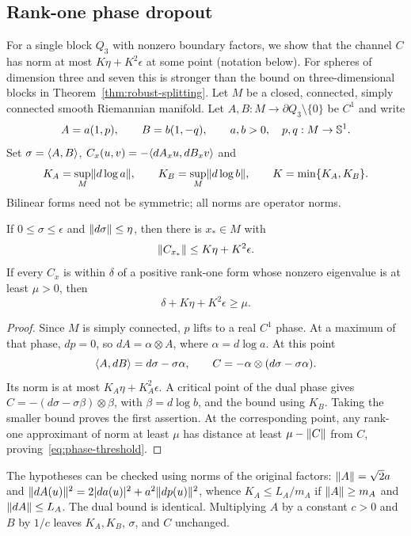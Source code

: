 \subsection{Rank-one phase dropout}
For a single block $Q_3$ with nonzero boundary factors, we show that
the channel $C$ has norm at most $K\eta+K^2\epsilon$ at some point
(notation below). For spheres of dimension
three and seven this is stronger than the bound on three-dimensional
blocks in Theorem~\ref{thm:robust-splitting}. Let $M$ be a closed, connected, simply connected smooth Riemannian manifold.
Let $A,B:M\to\partial Q_3\setminus\{0\}$ be $C^1$ and write
\[
 A=a(1,p),\qquad B=b(1,-q),\qquad a,b>0,\quad p,q:M\to\mathbb S^1.
\]
Set $\sigma=\langle A,B\rangle$, $C_x(u,v)=-\langle dA_xu,dB_xv\rangle$ and
\[
 K_A=\sup_M\lVert d\log a\rVert,\qquad K_B=\sup_M\lVert d\log b\rVert,
 \qquad K=\min\{K_A,K_B\}.
\]
Bilinear forms need not be symmetric; all norms are operator norms.

\begin{theorem}\label{thm:robust-phase}
If $0\leq\sigma\leq\epsilon$ and $\lVert d\sigma\rVert\leq\eta$, then
there is $x_*\in M$ with
\[
 \lVert C_{x_*}\rVert\leq K\eta+K^2\epsilon.
\]
If every $C_x$ is within $\delta$ of a positive rank-one form whose
nonzero eigenvalue is at least $\mu>0$, then
\begin{equation}\label{eq:phase-threshold}
 \delta+K\eta+K^2\epsilon\geq\mu.
\end{equation}
\end{theorem}
\begin{proof}
Since $M$ is simply connected, $p$ lifts to a real $C^1$ phase. At a maximum of
that phase, $dp=0$, so $dA=\alpha\otimes A$, where
$\alpha=d\log a$. At this point
\[
 \langle A,dB\rangle=d\sigma-\sigma\alpha,
 \qquad C=-\alpha\otimes(d\sigma-\sigma\alpha).
\]
Its norm is at most $K_A\eta+K_A^2\epsilon$. A critical point of the
dual phase gives $C=-(d\sigma-\sigma\beta)\otimes\beta$, with
$\beta=d\log b$, and the bound using $K_B$. Taking the smaller bound
proves the first assertion. At the corresponding point, any rank-one
approximant of norm at least $\mu$ has distance at least
$\mu-\lVert C\rVert$ from $C$, proving~\eqref{eq:phase-threshold}.
\end{proof}

The hypotheses can be checked using norms of the original factors:
$\lVert A\rVert=\sqrt2a$ and
$\lVert dA(u)\rVert^2=2|da(u)|^2+a^2\lVert dp(u)\rVert^2$, whence
$K_A\leq L_A/m_A$ if $\lVert A\rVert\geq m_A$ and $\lVert dA\rVert\leq L_A$.
The dual bound is identical. Multiplying $A$ by a constant $c>0$ and
$B$ by $1/c$ leaves $K_A,K_B$, $\sigma$, and $C$ unchanged.

